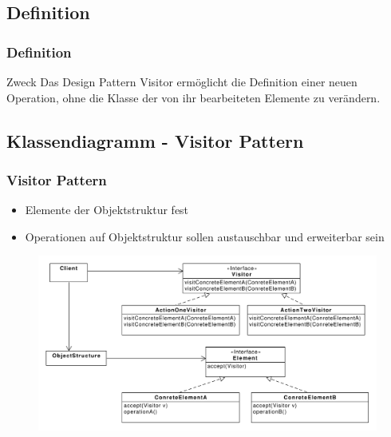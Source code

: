 \subsection{Definition}
\begin{frame}
  \frametitle{Definition}
  \begin{block}{Zweck}
  	 Das
Design Pattern Visitor ermöglicht die Definition einer neuen Operation, ohne die Klasse der
von ihr bearbeiteten Elemente zu verändern.
  \end{block}
  
\end{frame}

\subsection{Klassendiagramm - Visitor Pattern}
\begin{frame}
	\frametitle{Visitor Pattern}		
	\begin{itemize}
		\item Elemente der Objektstruktur fest
		\item Operationen auf Objektstruktur sollen austauschbar und erweiterbar sein
	\end{itemize}	
  	\begin{figure}
		\includegraphics[scale=.3]{paper/visitor/visitor}
	\end{figure}
\end{frame}

